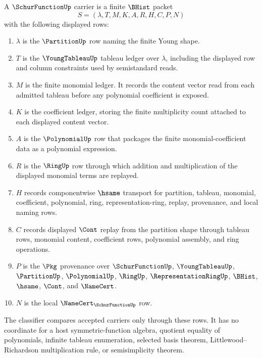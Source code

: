 \begin{definition}
\label{def:schur-function-carrier}
A $\SchurFunctionUp$ carrier is a finite $\BHist$ packet
$$
S=(\lambda,T,M,K,A,R,H,C,P,N)
$$
with the following displayed rows:
\begin{enumerate}
\item $\lambda$ is the $\PartitionUp$ row naming the finite Young shape.
\item $T$ is the $\YoungTableauUp$ tableau ledger over $\lambda$, including the displayed row and column constraints used by semistandard reads.
\item $M$ is the finite monomial ledger. It records the content vector read from each admitted tableau before any polynomial coefficient is exposed.
\item $K$ is the coefficient ledger, storing the finite multiplicity count attached to each displayed content vector.
\item $A$ is the $\PolynomialUp$ row that packages the finite monomial-coefficient data as a polynomial expression.
\item $R$ is the $\RingUp$ row through which addition and multiplication of the displayed monomial terms are replayed.
\item $H$ records componentwise $\hsame$ transport for partition, tableau, monomial, coefficient, polynomial, ring, representation-ring, replay, provenance, and local naming rows.
\item $C$ records displayed $\Cont$ replay from the partition shape through tableau rows, monomial content, coefficient rows, polynomial assembly, and ring operations.
\item $P$ is the $\Pkg$ provenance over $\SchurFunctionUp$, $\YoungTableauUp$, $\PartitionUp$, $\PolynomialUp$, $\RingUp$, $\RepresentationRingUp$, $\BHist$, $\hsame$, $\Cont$, and $\NameCert$.
\item $N$ is the local $\NameCert_{\SchurFunctionUp}$ row.
\end{enumerate}
The classifier compares accepted carriers only through these rows. It has no coordinate for a host symmetric-function algebra, quotient equality of polynomials, infinite tableau enumeration, selected basis theorem, Littlewood--Richardson multiplication rule, or semisimplicity theorem.
\end{definition}

